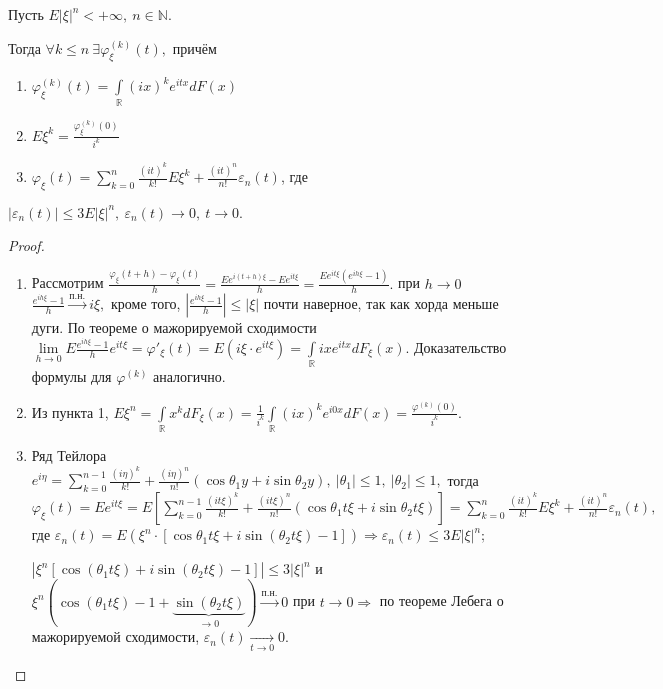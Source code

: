 	\begin{property}
	\begin{theorem}[о производных х.ф.]
		Пусть $E|\xi|^n < + \infty, ~n \in \mathbb{N}.$ 
		
		Тогда $\forall k \leqslant n~ \exists \varphi_\xi^{(k)}(t),$ причём
		\begin{enumerate}
			\item $\varphi_\xi^{(k)}(t) = \int\limits_\mathbb{R}(ix)^ke^{itx}dF(x)$
			\item $E\xi^k = \frac{\varphi_\xi^{(k)}(0)}{i^k}$
			\item $\varphi_\xi(t) = \sum\limits_{k = 0}^{n} \frac{(it)^k}{k!}E\xi^k + \frac{(it)^n}{n!}\varepsilon_n(t)$, где
		\end{enumerate}
		$|\varepsilon_n(t)| \leqslant 3E|\xi|^n, ~\varepsilon_n(t) \to 0, ~ t \to 0.$
	\end{theorem}
	\begin{proof}
		\begin{enumerate}
			\item Рассмотрим $\frac{\varphi_\xi(t + h) - \varphi_\xi(t)}{h} = \frac{Ee^{i(t + h)\xi} - Ee^{it\xi}}{h} = \frac{Ee^{it\xi}(e^{ih\xi} - 1)}{h}.$ при $h \to 0$ $\frac{e^{ih\xi} - 1}{h} \overset{\text{п.н.}}{\longrightarrow}i\xi,$ кроме того, $\left|\frac{e^{ih\xi} - 1}{h}\right| \leqslant |\xi|$ почти наверное, так как хорда меньше дуги. По теореме о мажорируемой сходимости
			$\lim\limits_{h \to 0}E \frac{e^{ih\xi} - 1}{h}e^{it\xi} = \varphi'_\xi(t) = E(i\xi\cdot e^{it\xi}) = \int\limits_\mathbb{R} ixe^{itx}dF_\xi(x).$ Доказательство формулы для $\varphi^{(k)}$ аналогично.
			\item Из пункта 1, $E\xi^n = \int\limits_\mathbb{R}x^k dF_\xi(x) = \frac{1}{i^k} \int\limits_\mathbb{R}(ix)^ke^{i0x}dF(x) = \frac{\varphi^{(k)}(0)}{i^k}.$
			\item Ряд Тейлора $e^{i\eta} = \sum\limits_{k = 0}^{n - 1} \frac{(i\eta)^k}{k!} + \frac{(i\eta)^n}{n!}(\cos\theta_1y + i\sin\theta_2 y), ~|\theta_1| \leqslant 1, ~ |\theta_2| \leqslant 1,$ тогда
			$\varphi_\xi(t) = Ee^{it\xi} = E\left[\sum\limits_{k = 0}^{n - 1} \frac{(it\xi)^k}{k!} + \frac{(it\xi)^n}{n!}(\cos\theta_1 t\xi + i\sin \theta_2 t\xi)\right] = \sum\limits_{k = 0}^{n}\frac{(it)^k}{k!}E\xi^k + \frac{(it)^n}{n!}\varepsilon_n(t), $ где $\varepsilon_n(t) = E(\xi^n\cdot [\cos\theta_1t\xi + i\sin(\theta_2 t\xi) - 1]) \Rightarrow \varepsilon_n(t) \leqslant 3E|\xi|^n;$

			$|\xi^n[\cos(\theta_1t\xi) + i\sin(\theta_2t\xi) - 1]| \leqslant3|\xi|^n$ и $\xi^n(\cos(\theta_1t\xi) - 1 + \underbrace{\sin(\theta_2 t\xi)}_{\to 0}) \overset{\text{п.н.}}{\longrightarrow} 0$ при $t \to 0 \Rightarrow$ по теореме Лебега о мажорируемой сходимости, $\varepsilon_n(t) \underset{t \to 0}{\longrightarrow} 0.$
		\end{enumerate}
	\end{proof}
	\end{property}
